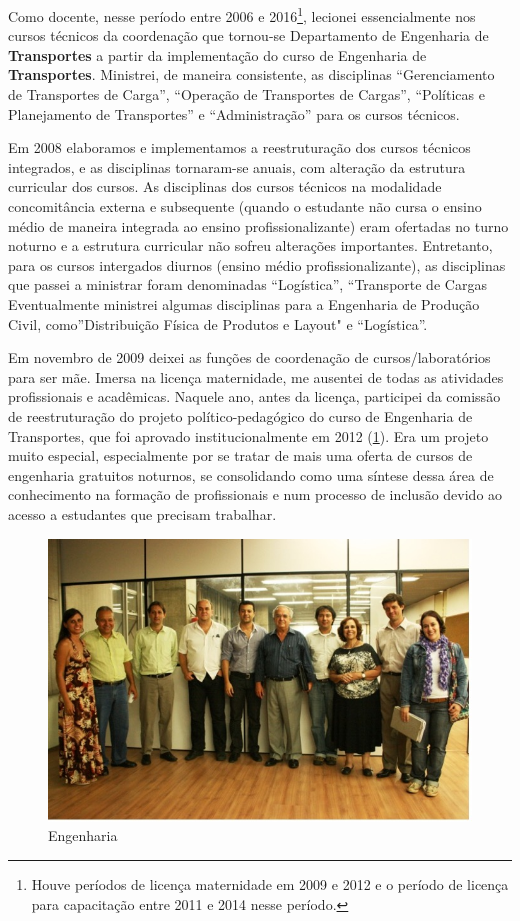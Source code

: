 \documentclass[
]{book}
\begin{document}
Como docente, nesse período entre 2006 e 2016\footnote{Houve períodos de licença maternidade em 2009 e 2012 e
  o período de licença para capacitação entre 2011 e 2014 nesse
  período.}, lecionei
essencialmente nos cursos técnicos da coordenação que tornou-se
Departamento de Engenharia de \textbf{Transportes} a partir da implementação
do curso de Engenharia de \textbf{Transportes}. Ministrei, de maneira
consistente, as disciplinas ``Gerenciamento de Transportes de Carga'',
``Operação de Transportes de Cargas'', ``Políticas e Planejamento de
Transportes'' e ``Administração'' para os cursos técnicos.

Em 2008 elaboramos e implementamos a reestruturação dos cursos técnicos
integrados, e as disciplinas tornaram-se anuais, com alteração da
estrutura curricular dos cursos. As disciplinas dos cursos técnicos na
modalidade concomitância externa e subsequente (quando o estudante não
cursa o ensino médio de maneira integrada ao ensino profissionalizante)
eram ofertadas no turno noturno e a estrutura curricular não sofreu
alterações importantes. Entretanto, para os cursos intergados diurnos
(ensino médio profissionalizante), as disciplinas que passei a ministrar
foram denominadas ``Logística'', ``Transporte de Cargas Eventualmente
ministrei algumas disciplinas para a Engenharia de Produção Civil, como''Distribuição Física de Produtos e Layout" e ``Logística''.

Em novembro de 2009 deixei as funções de coordenação de
cursos/laboratórios para ser mãe. Imersa na licença maternidade, me
ausentei de todas as atividades profissionais e acadêmicas. Naquele ano,
antes da licença, participei da comissão de reestruturação do projeto
político-pedagógico do curso de Engenharia de Transportes, que foi
aprovado institucionalmente em 2012 (\ref{fig:eng}). Era um projeto
muito especial, especialmente por se tratar de mais uma oferta de cursos
de engenharia gratuitos noturnos, se consolidando como uma síntese dessa
área de conhecimento na formação de profissionais e num processo de
inclusão devido ao acesso a estudantes que precisam trabalhar.

\begin{figure}
\includegraphics[width=1.3\linewidth]{img/Imagem1} \caption{Engenharia}\label{fig:eng}
\end{figure}
\end{document}
